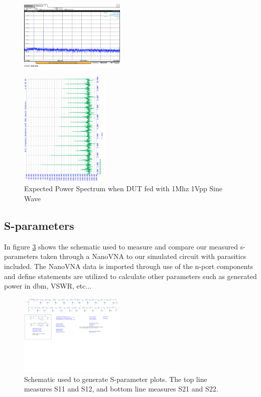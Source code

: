 \documentclass[journal]{IEEEtran} \usepackage[english]{babel}
\begin{document}
\begin{figure}[htb]
\centering
\includegraphics[width=0.45\textwidth]{MeasuredSpectrum.png}
\caption{}
\label{fig:MeasSpec}
\end{figure}

\begin{figure}[htb]
\centering
\includegraphics[width=0.38\textwidth,angle=-90]{SimulatedSpectrum.png}
\caption{Expected Power Spectrum when DUT fed with 1Mhz 1Vpp Sine Wave}
\label{fig:SimSpec}
\end{figure}




\subsection{S-parameters}


In figure \ref{fig:sparamSchem} shows the schematic used to measure and compare
our measured s-parameters taken through a NanoVNA to our simulated circuit with
parasitics included. The NanoVNA data is imported through use of the n-port
components and define statements are utilized to calculate other parameters such
as generated power in dbm, VSWR, etc...


\begin{figure}[htb]
\centering
\includegraphics[width=0.45\textwidth,page = 1]{images/MostRecentSparamMeasSchem.pdf}
\caption{Schematic used to generate S-parameter plots. The top line measures S11 and S12, and bottom line measures S21 and S22. 
}\label{fig:sparamSchem}
\end{figure}
\end{document}
